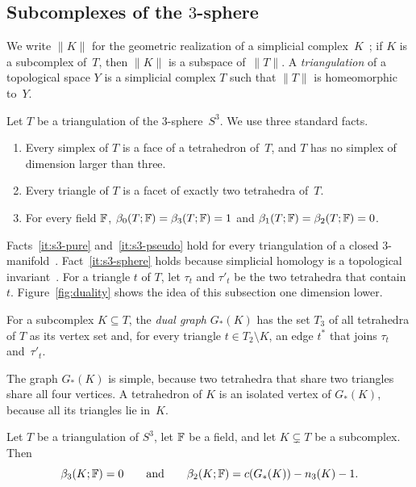\subsection{Subcomplexes of the \texorpdfstring{$3$}{3}-sphere}\label{sec:easy-s3}

We write $\lVert K\rVert$ for the geometric realization of a simplicial complex~$K$~\cite{Mun84}; if $K$ is a subcomplex of~$T$, then $\lVert K\rVert$ is a subspace of~$\lVert T\rVert$.
A \emph{triangulation} of a topological space $Y$ is a simplicial complex $T$ such that $\lVert T\rVert$ is homeomorphic to~$Y$.

Let $T$ be a triangulation of the $3$-sphere~$S^3$.
We use three standard facts.
\begin{enumerate}[label=(T\arabic*)]
\item\label{it:s3-pure} Every simplex of $T$ is a face of a tetrahedron of~$T$, and $T$ has no simplex of dimension larger than three.
\item\label{it:s3-pseudo} Every triangle of $T$ is a facet of exactly two tetrahedra of~$T$.
\item\label{it:s3-sphere} For every field $\mathbb{F}$, $\beta_0(T;\mathbb{F})=\beta_3(T;\mathbb{F})=1$ and $\beta_1(T;\mathbb{F})=\beta_2(T;\mathbb{F})=0$.
\end{enumerate}
Facts~\ref{it:s3-pure} and~\ref{it:s3-pseudo} hold for every triangulation of a closed $3$-manifold~\cite{Mun84}.
Fact~\ref{it:s3-sphere} holds because simplicial homology is a topological invariant~\cite{Mun84,Hat02}.
For a triangle $t$ of $T$, let $\tau_t$ and $\tau'_t$ be the two tetrahedra that contain~$t$.
Figure~\ref{fig:duality} shows the idea of this subsection one dimension lower.



\begin{definition}
For a subcomplex $K\subseteq T$, the \emph{dual graph} $G_\ast(K)$ has the set $T_3$ of all tetrahedra of $T$ as its vertex set and, for every triangle $t\in T_2\setminus K$, an edge $t^\ast$ that joins $\tau_t$ and~$\tau'_t$.
\end{definition}

The graph $G_\ast(K)$ is simple, because two tetrahedra that share two triangles share all four vertices.
A tetrahedron of $K$ is an isolated vertex of $G_\ast(K)$, because all its triangles lie in~$K$.

\begin{lemma}\label{lem:dual}
Let $T$ be a triangulation of $S^3$, let $\mathbb{F}$ be a field, and let $K\subsetneq T$ be a subcomplex.
Then
\[
  \beta_3(K;\mathbb{F})=0\qquad\text{and}\qquad\beta_2(K;\mathbb{F})=c(G_\ast(K))-n_3(K)-1.
\]
\end{lemma}

